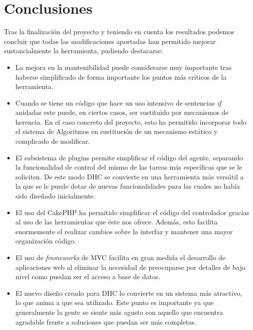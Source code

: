 \chapter{Conclusiones}

Tras la finalización del proyecto y teniendo en cuenta los resultados podemos concluir que todas las modificaciones aportadas han permitido mejorar sustancialmente la herramienta, pudiendo destacarse:

\begin{itemize}
	\item La mejora en la mantenibilidad puede considerarse muy importante tras haberse simplificado de forma importante los puntos más críticos de la herramienta.
	
	\item Cuando se tiene un código que hace un uso intensivo de sentencias \emph{if} anidadas este puede, en ciertos casos, ser sustituido por mecanismos de herencia. En el caso concreto del proyecto, esto ha permitido incorporar todo el sistema de Algoritmos en sustitución de un mecanismo estático y complicado de modificar.
	
	\item El subsistema de plugins permite simplificar el código del agente, separando la funcionalidad de control del mismo de las tareas más específicas que se le soliciten. De este modo DHC se convierte en una herramienta más versátil a la que se le puede dotar de nuevas funcionalidades para las cuales no había sido diseñado inicialmente.
	
	\item El uso del CakePHP ha permitido simplificar el código del controlador gracias al uso de las herramientas que éste nos ofrece. Además, esto facilita enormemente el realizar cambios sobre la interfaz y mantener una mayor organización código.
	
	\item El uso de \emph{frameworks} de MVC facilita en gran medida el desarrollo de aplicaciones web al eliminar la necesidad de preocuparse por detalles de bajo nivel como puedan ser el acceso a base de datos.

	\item El nuevo diseño creado para DHC lo convierte en un sistema más atractivo, lo que anima a que sea utilizado. Este punto es importante ya que generalmente la gente se siente más agusto con aquello que encuentra agradable frente a soluciones que puedan ser más completas.
	

\end{itemize}
